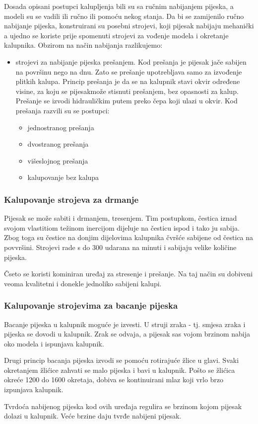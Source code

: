 \documentclass[a4paper,12pt]{article}
\numberwithin{figure}{section}
\begin{document}
Dosada opisani postupci kalupljenja bili su sa ručnim nabijanjem pijeska, a modeli su se vadili ili ručno ili pomoću nekog stanja. Da bi se zamijenilo ručno nabijanje pijeska, konstruirani su posebni strojevi, koji pijesak nabijaju mehanički a ujedno se koriste prije spomenuti strojevi za vođenje modela i okretanje kalupnika. Obzirom na način nabijanja razlikujemo:
\begin{itemize}
\item strojevi za nabijanje pijeska prešanjem. Kod prešanja je pijesak jače sabijen na površinu nego na dnu. Zato se prešanje upotrebljava samo za izvođenje plitkih kalupa. Princip prešanja je da se na kalupnik stavi okvir određene visine, za koju se pijesakmože stisnuti prešanjem, bez opasnosti za kalup. Prešanje se izvodi hidrauličkim putem preko čepa koji ulazi u okvir. Kod prešanja razvili su se postupci:
\begin{itemize}
\item jednostranog prešanja
\item dvostranog prešanja
\item višeslojnog prešanja
\item kalupovanje bez kalupa
\end{itemize}
\end{itemize}
\subsubsection{Kalupovanje strojeva za drmanje}
Pijesak se može sabiti i drmanjem, tresenjem. Tim postupkom, čestica iznad svojom vlastitiom težinom inercijom dijeluje na česticu ispod i tako ju sabija. Zbog toga su čestice na donjim dijelovima kalupnika čvršće sabijene od čestica na povvršini. Strojevi rade s do 300 udarana na minuti i sabijaju velike količine pijeska. \par
Čseto se koristi kominiran uređaj za stresenje i prešanje. Na taj način su dobiveni veoma kvalitetni i donekle jednoliko sabijeni kalupi.
\subsubsection{Kalupovanje strojevima za bacanje pijeska}
Bacanje pijeska u kalupnik moguće je izvesti. U struji zraka - tj. smjesa zraka i pijeska se dovodi u kalupnik. Zrak se odvaja, a pijesak sas vojom brzinom nabija oko modela i ispunjava kalupnik.\par
Drugi princip bacanja pijeska izvodi se pomoću rotirajuće žlice u glavi. Svaki okretanjem žlićice zahvati se malo pijeska i bavi u kalupnik. Pošto se žlićica okreće 1200 do 1600 okretaja, dobiva  se kontinuirani mlaz koji vrlo brzo izpunjava kalupnik.\par
Tvrdoća nabijenog pijeska kod ovih uređaja regulira se brzinom kojom pijesak dolazi u kalupnik. Veće brzine daju tvrđe nabijeni pijesak.
\end{document}

